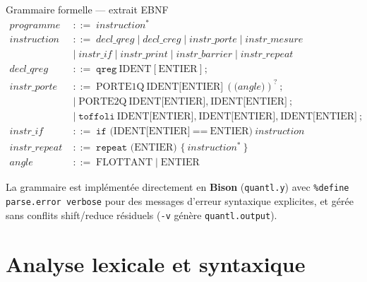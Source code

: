 \documentclass[10pt]{beamer}
\begin{document}
\begin{frame}{Grammaire formelle --- extrait EBNF}
  \small
  \begin{align*}
    \textit{programme} \;&::=\; \textit{instruction}^{*} \\
    \textit{instruction} \;&::=\; \textit{decl\_qreg} \mid \textit{decl\_creg} \mid \textit{instr\_porte} \mid \textit{instr\_mesure} \\
    &\mid\; \textit{instr\_if} \mid \textit{instr\_print} \mid \textit{instr\_barrier} \mid \textit{instr\_repeat} \\
    \textit{decl\_qreg} \;&::=\; \texttt{qreg}\ \text{IDENT}\ \texttt{[}\ \text{ENTIER}\ \texttt{]}\ \texttt{;} \\
    \textit{instr\_porte} \;&::=\; \text{PORTE1Q}\ \text{IDENT[ENTIER]}\ (\texttt{(}\textit{angle}\texttt{)})^{?}\ \texttt{;} \\
    &\mid\; \text{PORTE2Q}\ \text{IDENT[ENTIER]}\texttt{,}\ \text{IDENT[ENTIER]}\ \texttt{;} \\
    &\mid\; \texttt{toffoli}\ \text{IDENT[ENTIER]}\texttt{,}\ \text{IDENT[ENTIER]}\texttt{,}\ \text{IDENT[ENTIER]}\ \texttt{;} \\
    \textit{instr\_if} \;&::=\; \texttt{if (}\text{IDENT[ENTIER]}\ \texttt{==}\ \text{ENTIER}\texttt{)}\ \textit{instruction} \\
    \textit{instr\_repeat} \;&::=\; \texttt{repeat (}\text{ENTIER}\texttt{) \{}\ \textit{instruction}^{*}\ \texttt{\}} \\
    \textit{angle} \;&::=\; \text{FLOTTANT} \mid \text{ENTIER}
  \end{align*}
  \begin{warnbox}[title=Remarque]
    La grammaire est implémentée directement en \textbf{Bison} (\texttt{quantl.y}) avec \texttt{\%define parse.error verbose} pour des messages d'erreur syntaxique explicites, et gérée sans conflits shift/reduce résiduels (\texttt{-v} génère \texttt{quantl.output}).
  \end{warnbox}
\end{frame}

\section{Analyse lexicale et syntaxique}
\end{document}

